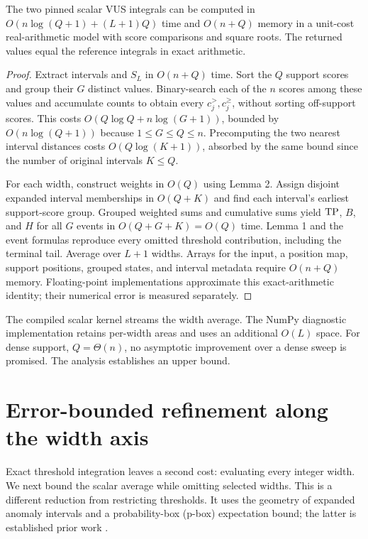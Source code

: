 \begin{theorem}
The two pinned scalar VUS integrals can be computed in
$O(n\log(Q+1)+(L+1)Q)$ time and $O(n+Q)$ memory in a unit-cost real-arithmetic
model with score comparisons and square roots.
The returned values equal the reference integrals in exact arithmetic.
\end{theorem}
\begin{proof}
Extract intervals and $S_L$ in $O(n+Q)$ time. Sort the $Q$ support scores and
group their $G$ distinct values. Binary-search each of the $n$ scores among
these values and accumulate counts to obtain every $c_j^>,\allowbreak c_j^\ge$, without
sorting off-support scores. This costs $O(Q\log Q+n\log(G+1))$, bounded by
$O(n\log(Q+1))$ because $1\le G\le Q\le n$. Precomputing the two nearest
interval distances costs $O(Q\log(K+1))$, absorbed by the same bound since
the number of original intervals $K\le Q$.

For each width, construct weights in $O(Q)$ using Lemma 2. Assign disjoint
expanded interval memberships in $O(Q+K)$ and find each interval's earliest
support-score group. Grouped weighted sums and cumulative sums yield $\mathrm{TP}$,
$B$, and $H$ for all $G$ events in $O(Q+G+K)=O(Q)$ time. Lemma 1 and the
event formulas reproduce every omitted threshold contribution, including the
terminal tail. Average over $L+1$ widths. Arrays for the input, a position map,
support positions, grouped states, and interval metadata require $O(n+Q)$
memory. Floating-point implementations approximate this exact-arithmetic
identity; their numerical error is measured separately.
\end{proof}
The compiled scalar kernel streams the width average. The NumPy diagnostic
implementation retains per-width areas and uses an additional $O(L)$ space.
For dense support, $Q=\Theta(n)$, no asymptotic improvement over a dense sweep
is promised. The analysis establishes an upper bound.

\section{Error-bounded refinement along the width axis}
\label{sec:width}
Exact threshold integration leaves a second cost: evaluating every integer
width. We next bound the scalar average while omitting selected widths.
This is a different reduction from restricting thresholds. It uses the
geometry of expanded anomaly intervals and a probability-box (p-box)
expectation bound; the latter is established prior work
\cite{utkin2009,troffaes2011}.

